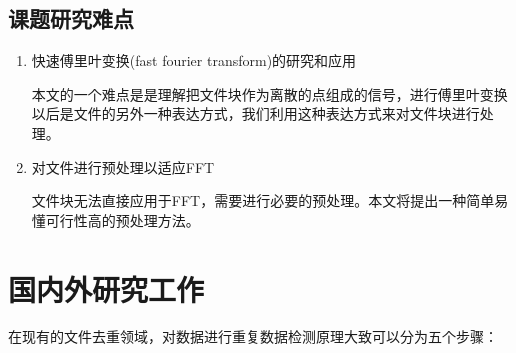 \subsection{课题研究难点}
\label{sec:point2}

\begin{enumerate}
\item 快速傅里叶变换(fast fourier transform)的研究和应用

本文的一个难点是是理解把文件块作为离散的点组成的信号，进行傅里叶变换以后是文件的另外一种表达方式，我们利用这种表达方式来对文件块进行处理。

\item 对文件进行预处理以适应FFT

文件块无法直接应用于FFT，需要进行必要的预处理。本文将提出一种简单易懂可行性高的预处理方法。
\end{enumerate}

\section{国内外研究工作}
\label{sec:relatedwork}

在现有的文件去重领域，对数据进行重复数据检测原理大致可以分为五个步骤：

